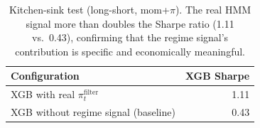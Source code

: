 \begin{table}[H]
\centering
\small
\begin{tabular}{l r}
\toprule
Configuration & XGB Sharpe \\
\midrule
XGB with real $\pi_t^{\text{filter}}$ & 1.11 \\
XGB without regime signal (baseline) & 0.43 \\
\bottomrule
\end{tabular}
\caption{Kitchen-sink test (long-short, mom+$\pi$). The real HMM signal more than doubles the Sharpe ratio (1.11 vs.\ 0.43), confirming that the regime signal's contribution is specific and economically meaningful.}
\label{tab:kitchen_sink}
\end{table}
